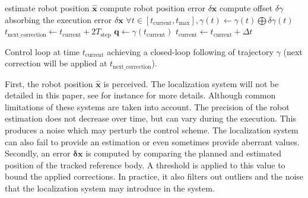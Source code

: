 %
%
\begin{algorithm}
  \begin{algorithmic}
    \STATE estimate robot position $\mathbf{\hat{x}}$
    \STATE compute robot position error $\delta \mathbf{x}$
    \STATE compute offset $\delta \gamma$ absorbing the execution
    error $\delta \mathbf{x}$
    \STATE $\forall t \in [t_{\text{current}}, t_{\text{max}}],
    \gamma(t) \leftarrow \gamma(t) \bigoplus \delta \gamma(t)$
    \STATE $t_{\text{next\_correction}} \leftarrow t_{\text{current}} + 2 T_{\text{step}}$
    \ENDIF
    \ENDIF
    \STATE $\mathbf{q} \leftarrow \gamma(t_{\text{current}})$
    \STATE $t_{\text{current}} \leftarrow t_{\text{current}} + \Delta t$
  \end{algorithmic}
  \caption{Control loop at time $t_{\text{current}}$ achieving a
    closed-loop following of trajectory $\gamma$ (next correction will
    be applied at
    $t_{\text{next\_correction}}$). \label{fig:control_loop}}
\end{algorithm}
%
%
First, the robot position $\hat{\mathbf{x}}$ is perceived. The
localization system will not be detailed in this paper, see
\cite{08ijhr.stasse, 06humanoids.thompson} for instance for more
details. Although common limitations of these systems are taken into
account. The precision of the robot estimation does not decrease over
time, but can vary during the execution. This produces a noise which
may perturb the control scheme. The localization system can also fail
to provide an estimation or even sometimes provide aberrant values.
%
Secondly, an error $\mathbf{\delta \mathbf{x}}$ is computed by
comparing the planned and estimated position of the tracked reference
body. A threshold is applied to this value to bound the applied
corrections. In practice, it also filters out outliers and the noise
that the localization system may introduce in the system.
%
%
